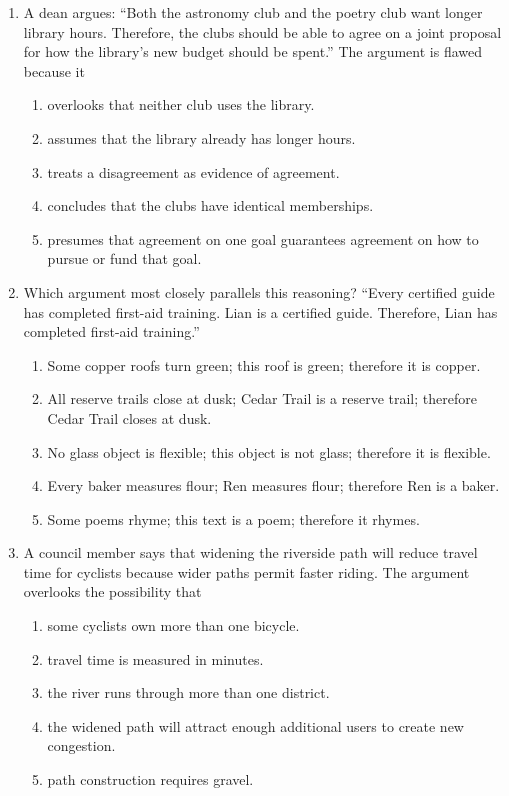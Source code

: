 \begin{enumerate}
\item A dean argues: ``Both the astronomy club and the poetry club want longer
library hours. Therefore, the clubs should be able to agree on a joint proposal
for how the library's new budget should be spent.'' The argument is flawed because
it
  \begin{enumerate}
  \item overlooks that neither club uses the library.
  \item assumes that the library already has longer hours.
  \item treats a disagreement as evidence of agreement.
  \item concludes that the clubs have identical memberships.
  \item presumes that agreement on one goal guarantees agreement on how to pursue
        or fund that goal.
  \end{enumerate}

\item Which argument most closely parallels this reasoning? ``Every certified
guide has completed first-aid training. Lian is a certified guide. Therefore,
Lian has completed first-aid training.''
  \begin{enumerate}
  \item Some copper roofs turn green; this roof is green; therefore it is copper.
  \item All reserve trails close at dusk; Cedar Trail is a reserve trail;
        therefore Cedar Trail closes at dusk.
  \item No glass object is flexible; this object is not glass; therefore it is
        flexible.
  \item Every baker measures flour; Ren measures flour; therefore Ren is a baker.
  \item Some poems rhyme; this text is a poem; therefore it rhymes.
  \end{enumerate}

\item A council member says that widening the riverside path will reduce travel
time for cyclists because wider paths permit faster riding. The argument overlooks
the possibility that
  \begin{enumerate}
  \item some cyclists own more than one bicycle.
  \item travel time is measured in minutes.
  \item the river runs through more than one district.
  \item the widened path will attract enough additional users to create new
        congestion.
  \item path construction requires gravel.
  \end{enumerate}


\end{enumerate}
